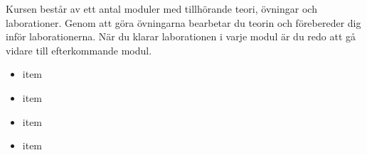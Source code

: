 
\begin{framed}

\end{framed}

Kursen består av ett antal moduler med tillhörande teori, övningar och laborationer. Genom att göra övningarna bearbetar du teorin och förebereder dig inför laborationerna. När du klarar laborationen i varje modul är du redo att gå vidare till efterkommande modul.  

\newcommand{\Subsection}[1]{} %

\newenvironment{Slide}[2][]
  {\begin{framed}\setlist{noitemsep}\section*{#2}}
  {\end{framed}}

\newif\ifkompendium
\kompendiumtrue



\begin{itemize}
\item item
\item item
\item item
\item item
\end{itemize}

